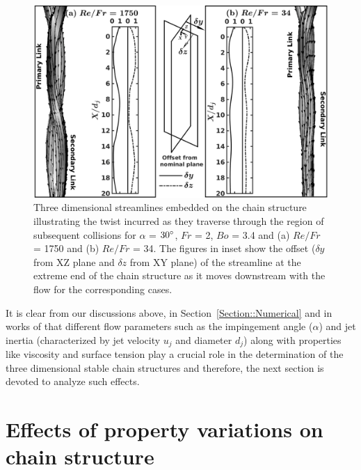 \documentclass[%
aip,
sd,%
amsmath,amssymb,
preprint,%
author-year,%
]{revtex4-1}
\begin{document}
\begin{figure}
	\centering
	\includegraphics[width=\linewidth]{fig1}
	\caption{Three dimensional streamlines embedded on the chain structure illustrating the twist incurred as they traverse through the region of subsequent collisions for $\alpha$ = $30\degree$, $Fr$ = 2, $Bo$ = 3.4 and (a) $Re/Fr$ = 1750 and (b) $Re/Fr$ = 34. The figures in inset show the offset ($\delta y$ from XZ plane and $\delta z$ from XY plane) of the streamline at the extreme end of the chain structure as it moves downstream with the flow for the corresponding cases.}
	\label{Figure::stream}
\end{figure}
It is clear from our discussions above, in Section~\ref{Section::Numerical} and in works of \cite{yang2014liquid} that different flow parameters such as the impingement angle ($\alpha$) and jet inertia (characterized by jet velocity $u_j$ and diameter $d_j$) along with properties like viscosity and surface tension play a crucial role in the determination of the three dimensional stable chain structures and therefore, the next section is devoted to analyze such effects.
\section{Effects of property variations on chain structure} \label{Section::ParametricVariations}
\end{document}
